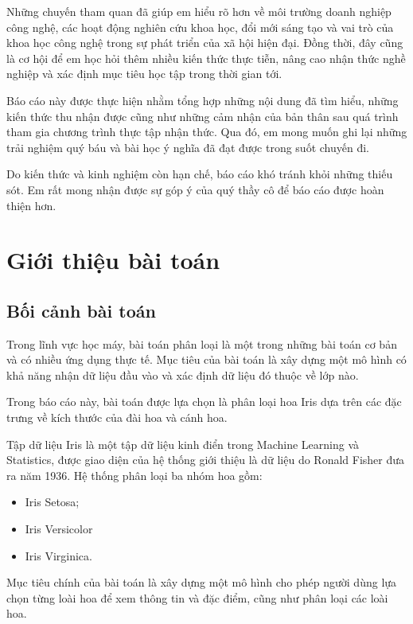 \documentclass[12pt,a4paper]{report}
\begin{document}
	Những chuyến tham quan đã giúp em hiểu rõ hơn về môi trường doanh nghiệp công nghệ, các hoạt động nghiên cứu khoa học, đổi mới sáng tạo và vai trò của khoa học công nghệ trong sự phát triển của xã hội hiện đại. Đồng thời, đây cũng là cơ hội để em học hỏi thêm nhiều kiến thức thực tiễn, nâng cao nhận thức nghề nghiệp và xác định mục tiêu học tập trong thời gian tới.
	
	Báo cáo này được thực hiện nhằm tổng hợp những nội dung đã tìm hiểu, những kiến thức thu nhận được cũng như những cảm nhận của bản thân sau quá trình tham gia chương trình thực tập nhận thức. Qua đó, em mong muốn ghi lại những trải nghiệm quý báu và bài học ý nghĩa đã đạt được trong suốt chuyến đi.
	
	Do kiến thức và kinh nghiệm còn hạn chế, báo cáo khó tránh khỏi những thiếu sót. Em rất mong nhận được sự góp ý của quý thầy cô để báo cáo được hoàn thiện hơn.
	
	\newpage
	\chapter{Giới thiệu bài toán}
	\section{Bối cảnh bài toán}
	
	Trong lĩnh vực học máy, bài toán phân loại là một trong những bài toán cơ bản và có nhiều ứng dụng thực tế. Mục tiêu của bài toán là xây dựng một mô hình có khả năng nhận dữ liệu đầu vào và xác định dữ liệu đó thuộc về lớp nào.
	
	Trong báo cáo này, bài toán được lựa chọn là phân loại hoa Iris dựa trên các đặc trưng về kích thước của đài hoa và cánh hoa.
	
	Tập dữ liệu Iris là một tập dữ liệu kinh điển trong Machine Learning và Statistics, được giao diện của hệ thống giới thiệu là dữ liệu do Ronald Fisher đưa ra năm 1936. Hệ thống phân loại ba nhóm hoa gồm:
	
	\begin{itemize}
		\item 	Iris Setosa;
		\item  	Iris Versicolor
		\item 	Iris Virginica.
	\end{itemize}
	
	Mục tiêu chính của bài toán là xây dựng một mô hình cho phép người dùng lựa chọn từng loài hoa để xem thông tin và đặc điểm, cũng như phân loại các loài hoa.
	
\end{document}
